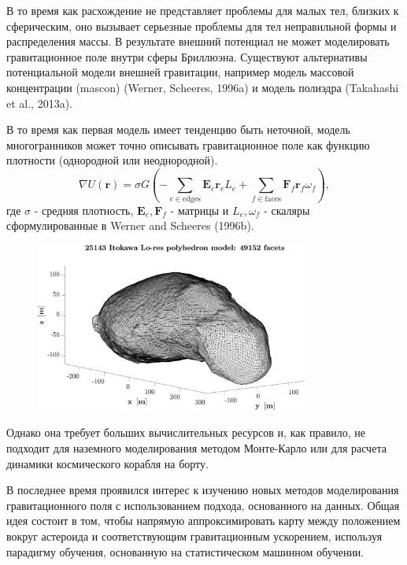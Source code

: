 В то время как расхождение не представляет проблемы для малых тел, близких к сферическим, оно вызывает серьезные проблемы для тел неправильной формы и распределения массы. В результате внешний потенциал не может моделировать гравитационное поле внутри сферы Бриллюэна. Существуют альтернативы потенциальной модели внешней гравитации, например модель массовой концентрации (mascon) (Werner, Scheeres, 1996a) и модель полиэдра (Takahashi et al., 2013a).

В то время как первая модель имеет тенденцию быть неточной, модель многогранников может точно описывать гравитационное поле как функцию плотности (однородной или неоднородной).
\[
    \nabla U(\mathbf{r}) = \sigma G
    \left(
        - \sum_{e \in \text{edges}}\mathbf{E}_e \mathbf{r}_e L_e
        + \sum_{f \in \text{faces}}\mathbf{F}_f \mathbf{r}_f \omega_f
    \right),
\]
где $\sigma$ - средняя плотность, $\mathbf{E}_e, \mathbf{F}_f$ - матрицы и $L_e, \omega_f$ - скаляры сформулированные в Werner and Scheeres (1996b).
\begin{figure}[h]
    \centering
    \includegraphics[width=0.8\textwidth]{chapters/tikhonov_s2/images/poly}
    \label{fg:1}
\end{figure}

Однако она требует больших вычислительных ресурсов и, как правило, не подходит для наземного моделирования методом Монте-Карло или для расчета динамики космического корабля на борту.

В последнее время проявился интерес к изучению новых методов моделирования гравитационного поля с использованием подхода, основанного на данных.
Общая идея состоит в том, чтобы напрямую аппроксимировать карту между положением вокруг астероида и соответствующим гравитационным ускорением, используя парадигму обучения, основанную на статистическом машинном обучении.

